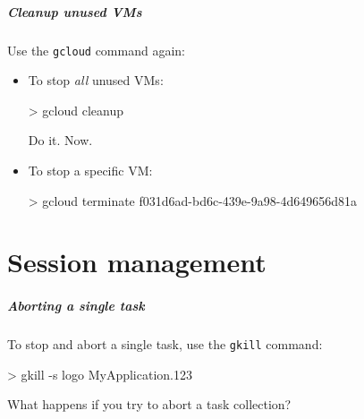 \documentclass[english,serif,mathserif,usenames,dvipsnames]{beamer}
\begin{document}





\begin{frame}
  \frametitle{Cleanup unused VMs}

  Use the \texttt{gcloud} command again:

  \begin{itemize}
  \item To stop \emph{all} unused VMs:
\begin{semiverbatim}
    > gcloud cleanup
\end{semiverbatim}

    \begin{exercise}
      Do it. Now.
    \end{exercise}

  \item To stop a specific VM:
\begin{semiverbatim}
    > gcloud terminate f031d6ad-bd6c-439e-9a98-4d649656d81a
\end{semiverbatim}
  \end{itemize}
\end{frame}


\part{Session management}

\begin{frame}
  \frametitle{Aborting a single task}

  To stop and abort a single task, use the \texttt{gkill} command:
\begin{semiverbatim}
    > gkill -s logo MyApplication.123
\end{semiverbatim}

  \pause
  \begin{exercise*}
    What happens if you try to abort a task collection?
  \end{exercise*}
\end{frame}
\end{document}
